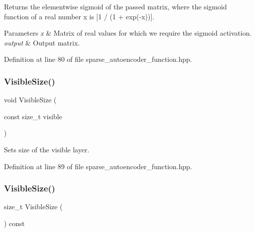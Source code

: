 Returns the elementwise sigmoid of the passed matrix, where the sigmoid function of a real number \textquotesingle{}x\textquotesingle{} is [1 / (1 + exp(-\/x))]. 


\begin{DoxyParams}{Parameters}
{\em x} & Matrix of real values for which we require the sigmoid activation. \\
\hline
{\em output} & Output matrix. \\
\hline
\end{DoxyParams}


Definition at line 80 of file sparse\+\_\+autoencoder\+\_\+function.\+hpp.

\mbox{\label{classmlpack_1_1nn_1_1SparseAutoencoderFunction_a56ba0c1d534d55c931e725914b00a100}} 
\subsubsection{Visible\+Size()\hspace{0.1cm}{\footnotesize\ttfamily [1/2]}}
{\footnotesize\ttfamily void Visible\+Size (\begin{DoxyParamCaption}\item[{const size\+\_\+t}]{visible }\end{DoxyParamCaption})\hspace{0.3cm}{\ttfamily [inline]}}



Sets size of the visible layer. 



Definition at line 89 of file sparse\+\_\+autoencoder\+\_\+function.\+hpp.

\mbox{\label{classmlpack_1_1nn_1_1SparseAutoencoderFunction_a3cea635d43096bb8cd925c74dcdd1d48}} 
\subsubsection{Visible\+Size()\hspace{0.1cm}{\footnotesize\ttfamily [2/2]}}
{\footnotesize\ttfamily size\+\_\+t Visible\+Size (\begin{DoxyParamCaption}{ }\end{DoxyParamCaption}) const\hspace{0.3cm}{\ttfamily [inline]}}



